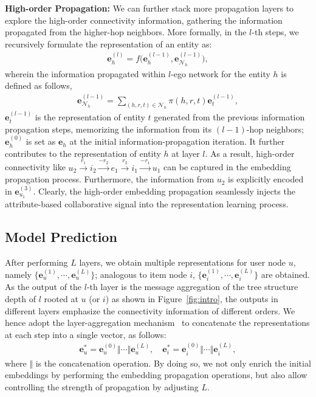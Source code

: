 \documentclass[sigconf]{acmart}
\newcommand{\Mat}[1]{\mathbf{#1}}
\newcommand{\Set}[1]{\mathcal{#1}}
\theoremstyle{definition}
\begin{document}
\vspace{5px}
\noindent\textbf{High-order Propagation:}
We can further stack more propagation layers to explore the high-order connectivity information, gathering the information propagated from the higher-hop neighbors.
More formally, in the $l$-th steps, we recursively formulate the representation of an entity as:
\begin{gather}\label{equ:l-aggregator}
    \Mat{e}_{h}^{(l)}=f\Big(\Mat{e}^{(l-1)}_{h}, \Mat{e}^{(l-1)}_{\Set{N}_{h}}\Big),
\end{gather}
wherein the information propagated within $l$-ego network for the entity $h$ is defined as follows,
\begin{gather}\label{equ:l-message}
    \Mat{e}^{(l-1)}_{\Set{N}_{h}}=\sum_{(h,r,t)\in\Set{N}_{h}}\pi(h,r,t)\Mat{e}^{(l-1)}_{t},
\end{gather}
$\Mat{e}_{t}^{(l-1)}$ is the representation of entity $t$ generated from the previous information propagation steps, memorizing the information from its $(l-1)$-hop neighbors;
$\Mat{e}_{h}^{(0)}$ is set as $\Mat{e}_{h}$ at the initial information-propagation iteration.
It further contributes to the representation of entity $h$ at layer $l$.
As a result, high-order connectivity like $u_2\xrightarrow{r_1} i_{2}\xrightarrow{-r_2} e_1 \xrightarrow{r_2} i_1\xrightarrow{-r_1} u_1$ can be captured in the embedding propagation process.
Furthermore, the information from $u_{2}$ is explicitly encoded in $\Mat{e}^{(3)}_{u_{1}}$.
Clearly, the high-order embedding propagation seamlessly injects the attribute-based collaborative signal into the representation learning process.


\subsection{Model Prediction}


After performing $L$ layers, we obtain multiple representations for user node $u$, namely $\{\Mat{e}^{(1)}_{u},\cdots,\Mat{e}^{(L)}_{u}\}$;
analogous to item node $i$, $\{\Mat{e}^{(1)}_{i},\cdots,\Mat{e}^{(L)}_{i}\}$ are obtained.
As the output of the $l$-th layer is the message aggregation of the tree structure depth of $l$ rooted at $u$ (or $i$) as shown in Figure~\ref{fig:intro}, the outputs in different layers emphasize the connectivity information of different orders.
We hence adopt the layer-aggregation mechanism~\cite{JumpKG} to concatenate the representations at each step into a single vector, as follows:
\begin{align}\label{equ:final-rep}
    \Mat{e}^{*}_{u}=\Mat{e}^{(0)}_{u}\Vert\cdots\Vert\Mat{e}^{(L)}_{u},\quad
    \Mat{e}^{*}_{i}=\Mat{e}^{(0)}_{i}\Vert\cdots\Vert\Mat{e}^{(L)}_{i},
\end{align}
where $\Vert$ is the concatenation operation.
By doing so, we not only enrich the initial embeddings by performing the embedding propagation operations, but also allow controlling the strength of propagation by adjusting $L$.
\end{document}
